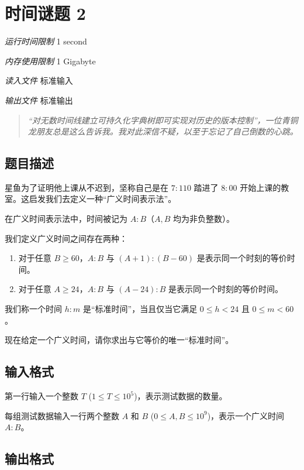 \section[J. 时间谜题 2]{ 时间谜题 2}

\textit{运行时间限制}   1 second

\textit{内存使用限制} 1 Gigabyte

\textit{读入文件} \qquad 标准输入

\textit{输出文件} \qquad 标准输出


\begin{quote}
	\textit{``对无数时间线建立可持久化字典树即可实现对历史的版本控制''，一位青铜龙朋友总是这么告诉我。我对此深信不疑，以至于忘记了自己倒数的心跳。}
\end{quote}

\subsection{题目描述}

星鱼为了证明他上课从不迟到，坚称自己是在 $7{:}110$ 踏进了 $8{:}00$ 开始上课的教室。这启发我们去定义一种``广义时间表示法''。

在广义时间表示法中，时间被记为 $A{:}B$（$A, B$ 均为非负整数）。

我们定义广义时间之间存在两种：

\begin{enumerate}
	\item 对于任意 $B \ge 60$，$A{:}B$ 与 $(A + 1){:}(B - 60)$ 是表示同一个时刻的等价时间。
	\item 对于任意 $A \ge 24$，$A{:}B$ 与 $(A - 24){:}B$ 是表示同一个时刻的等价时间。
\end{enumerate}

我们称一个时间 $h{:}m$ 是``标准时间''，当且仅当它满足 $0 \le h < 24$ 且 $0 \le m < 60$。

现在给定一个广义时间，请你求出与它等价的唯一``标准时间''。

\subsection{输入格式}

第一行输入一个整数 $T$ ($1 \le T \le 10^5$)，表示测试数据的数量。

每组测试数据输入一行两个整数 $A$ 和 $B$ ($0 \le A, B \le 10^9$)，表示一个广义时间 $A{:}B$。

\subsection{输出格式}


